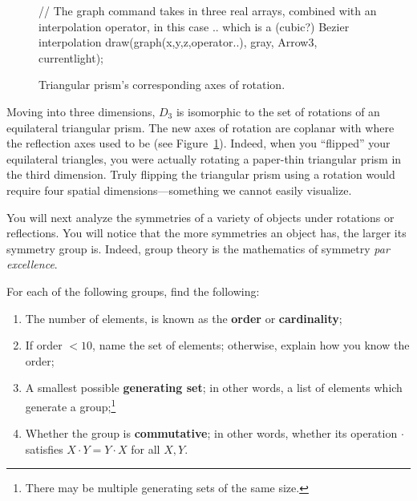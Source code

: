 \documentclass[../textbook.tex]{subfiles}
\begin{document}
\begin{figure}[h]
\begin{center}
\begin{minipage}[b]{\textwidth}
\begin{asy}[width=0.5\textwidth]
				// The graph command takes in three real arrays, combined with an interpolation operator, in this case .. which is a (cubic?) Bezier interpolation
				draw(graph(x,y,z,operator..), gray, Arrow3, currentlight);
			\end{asy}
		\end{minipage}
	\end{center}
	\vspace*{-2\baselineskip}
	\begin{center}
		\begin{minipage}[t]{\textwidth}
			\caption{Triangular prism's corresponding axes of rotation.}
			\label{fig:tri_prism_rot}
		\end{minipage}
	\end{center}
	\vspace*{-2\baselineskip}
\end{figure}

Moving into three dimensions, $D_3$ is isomorphic to the set of rotations of an equilateral triangular prism. The new axes of rotation are coplanar with where the reflection axes used to be (see Figure~\ref{fig:tri_prism_rot}). Indeed, when you ``flipped'' your equilateral triangles, you were actually rotating a paper-thin triangular prism in the third dimension. Truly flipping the triangular prism using a rotation would require four spatial dimensions---something we cannot easily visualize.

You will next analyze the symmetries of a variety of objects under rotations or reflections. You will notice that the more symmetries an object has, the larger its symmetry group is. Indeed, group theory is the mathematics of symmetry \textit{par excellence}.

For each of the following groups, find the following:

\begin{enumerate}[label=(\alph*)]
\item The number of elements, is known as the \textbf{order} or \textbf{cardinality};
\item If order $< 10$, name the set of elements; otherwise, explain how you know the order;
\item A smallest possible \textbf{generating set}; in other words, a list of elements which generate a group;\footnote{There may be multiple generating sets of the same size.}
\item Whether the group is \textbf{commutative}; in other words, whether its operation $\cdot$ satisfies $X\cdot Y=Y\cdot X$ for all $X,Y$. %
\end{enumerate}
\end{document}

